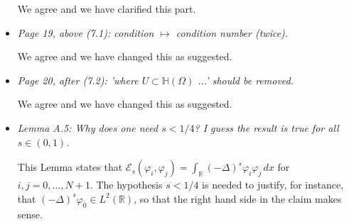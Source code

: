 \documentclass[11 pt]{article}
\numberwithin{equation}{section}
\def\r{\mathbb{R}}
\def\R{\mathbb{R}}
\def\cE{\mathcal{E}}
\begin{document}
\begin{itemize}
   We agree and we have clarified this part.

    \item \emph{Page 19, above (7.1): condition \(\mapsto\) condition number (twice).}

    We agree and we have changed this as suggested.

    \item \emph{Page 20, after (7.2): 'where \(U\subset{\mathbb{H}}(\Omega)\) ...' should be removed.}

        We agree and we have changed this as suggested.

    \item \emph{Lemma A.5: Why does one need \(s<1/4\)? I guess the result is true for all \(s\in(0,1)\).}

    This Lemma states that $\cE_s(\varphi_i,\varphi_j)=\int_{\R}(-\Delta)^s\varphi_i\varphi_j\, dx$ for $i,j=0,\ldots,N+1$.  The hypothesis $s<1/4$ is needed to justify, for instance, that $(-\Delta)^s\varphi_0\in L^2(\R)$, so that the right hand side in the claim makes sense.

%


\end{itemize}








\newpage
\end{document}
